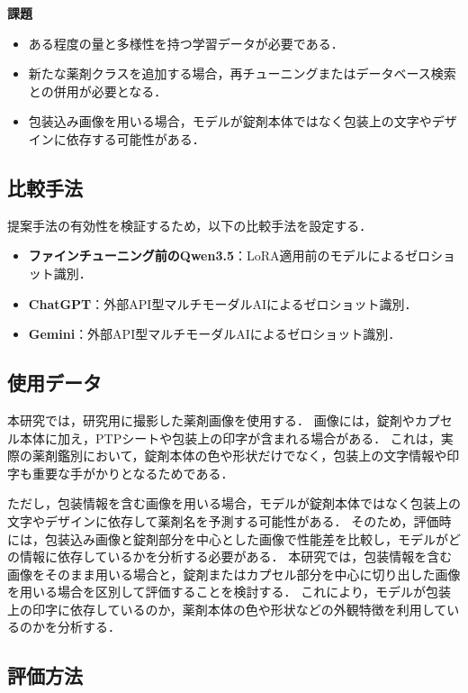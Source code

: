 \documentclass{jsarticle}
\begin{document}
\textbf{課題}
\begin{itemize}
  \item ある程度の量と多様性を持つ学習データが必要である．
  \item 新たな薬剤クラスを追加する場合，再チューニングまたはデータベース検索との併用が必要となる．
  \item 包装込み画像を用いる場合，モデルが錠剤本体ではなく包装上の文字やデザインに依存する可能性がある．
\end{itemize}

\subsection{比較手法}

提案手法の有効性を検証するため，以下の比較手法を設定する．

\begin{itemize}
  \item \textbf{ファインチューニング前のQwen3.5}：LoRA適用前のモデルによるゼロショット識別．
  \item \textbf{ChatGPT}：外部API型マルチモーダルAIによるゼロショット識別．
  \item \textbf{Gemini}：外部API型マルチモーダルAIによるゼロショット識別．
\end{itemize}

\subsection{使用データ}

本研究では，研究用に撮影した薬剤画像を使用する．
画像には，錠剤やカプセル本体に加え，PTPシートや包装上の印字が含まれる場合がある．
これは，実際の薬剤鑑別において，錠剤本体の色や形状だけでなく，包装上の文字情報や印字も重要な手がかりとなるためである．

ただし，包装情報を含む画像を用いる場合，モデルが錠剤本体ではなく包装上の文字やデザインに依存して薬剤名を予測する可能性がある．
そのため，評価時には，包装込み画像と錠剤部分を中心とした画像で性能差を比較し，モデルがどの情報に依存しているかを分析する必要がある．
本研究では，包装情報を含む画像をそのまま用いる場合と，錠剤またはカプセル部分を中心に切り出した画像を用いる場合を区別して評価することを検討する．
これにより，モデルが包装上の印字に依存しているのか，薬剤本体の色や形状などの外観特徴を利用しているのかを分析する．

\subsection{評価方法}
\end{document}
